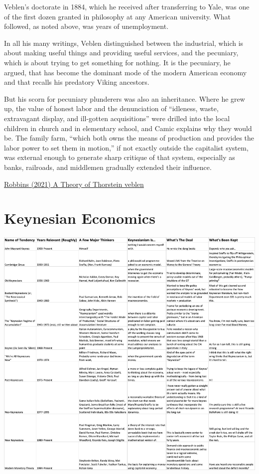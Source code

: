 \documentclass[
]{book}
\begin{document}
Veblen's doctorate in 1884, which he received after transferring to Yale, was one of the first dozen granted in philosophy at any American university. What followed, as noted above, was years of unemployment.

In all his many writings, Veblen distinguished between the industrial, which is about making useful things and providing useful services, and the pecuniary, which is about trying to get something for nothing. It is the pecuniary, he argued, that has become the dominant mode of the modern American economy and that recalls his predatory Viking ancestors.

But his scorn for pecuniary plunderers was also an inheritance. Where he grew up, the value of honest labor and the denunciation of ``idleness, waste, extravagant display, and ill-gotten acquisitions'' were drilled into the local children in church and in elementary school, and Camic explains why they would be. The family farm, ``which both owns the means of production and provides the labor power to set them in motion,'' if not exactly outside the capitalist system, was external enough to generate sharp critique of that system, especially as banks, railroads, and middlemen gradually extended their influence.

\href{https://thebaffler.com/latest/a-theory-of-thorstein-veblen-robbins}{Robbins (2021) A Theory of Thorstein veblen}

\hypertarget{keynesian-economics}{%
\chapter{Keynesian Economics}\label{keynesian-economics}}

\includegraphics{fig/keynesianisms.png}
\end{document}
